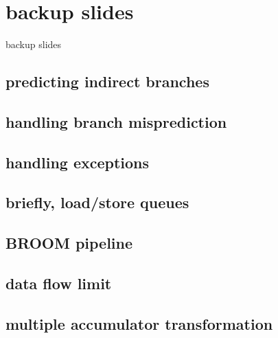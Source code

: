 
\section{backup slides}
\begin{frame}{backup slides}
\end{frame}

\subsection{predicting indirect branches}



\subsection{handling branch misprediction}


\subsection{handling exceptions}
 

\subsection{briefly, load/store queues}

\subsection{BROOM pipeline}

\subsection{data flow limit}


\subsection{multiple accumulator transformation}

